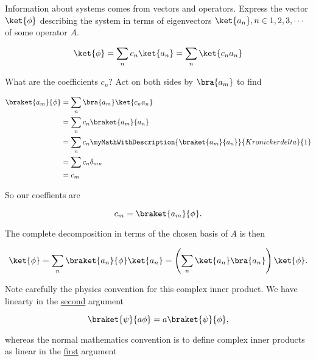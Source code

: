 %
%
%

Information about systems comes from vectors and operators.  Express the vector $\ket{\phi}$ describing the system in terms of eigenvectors $\ket{a_n}, n \in 1,2,3,\cdots$ of some operator $A$.

\begin{equation}\label{eqn:PHY356FLecture10:51}
\ket{\phi} = \sum_n c_n \ket{a_n} = \sum_n \ket{c_n a_n}
\end{equation}

What are the coefficients $c_n$?  Act on both sides by $\bra{a_m}$ to find

\begin{align*}
\braket{a_m}{\phi}
&= \sum_n \bra{a_m} \ket{ c_n a_n } \\
&= \sum_n c_n \braket{a_m}{ a_n } \\
&= \sum_n c_n \myMathWithDescription{\braket{a_m}{a_n}}{Kronicker delta}{1}  \\
&= \sum c_n \delta_{mn} \\
&= c_m
\end{align*}

So our coeffients are

\begin{equation}\label{eqn:PHY356FLecture10:51c}
c_m = \braket{a_m}{\phi}.
\end{equation}

The complete decomposition in terms of the chosen basis of $A$ is then

\begin{equation}\label{eqn:PHY356FLecture10:51b}
\ket{\phi} = \sum_n \braket{a_n}{\phi} \ket{a_n}
= \left( \sum_n \ket{a_n} \bra{a_n} \right) \ket{\phi}.
\end{equation}

Note carefully the physics convention for this complex inner product.  We have linearty in the \underline{second} argument

\begin{equation}\label{eqn:PHY356FLecture10:51e}
\braket{\psi}{a \phi} = a \braket{\psi}{\phi},
\end{equation}

whereas the normal mathematics convention is to define complex inner products as linear in the \underline{first} argument

